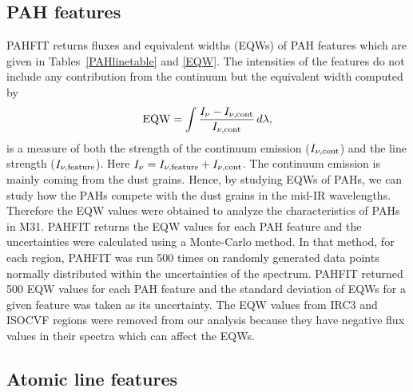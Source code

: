 \subsection{PAH features}
\label{sect:pah}
%
PAHFIT returns fluxes and equivalent widths (EQWs) of PAH features which are given in Tables~\ref{PAHlinetable} and \ref{EQW}. The intensities of the features do not include any contribution from the continuum but the equivalent width computed by
\begin{equation}
{\rm EQW}=\int \frac{I_{\nu} - I_{\nu, {\rm cont}}}{I_{\nu, {\rm cont}}} \,d\lambda,
\end{equation}
is a measure of both the strength of the continuum emission ($I_{\nu, {\rm cont}} $) and the line strength ($I_{\nu,{\rm feature}}$). 
Here $I_{\nu} =I_{\nu,{\rm feature}}+ I_{\nu, {\rm cont}} $. 
The continuum emission is mainly coming from the dust grains. Hence, by studying EQWs of PAHs, we can study how the PAHs compete with the dust grains in the mid-IR wavelengths. Therefore the EQW values were obtained to analyze the characteristics of PAHs in M31. PAHFIT returns the EQW values for each PAH feature and the uncertainties were calculated using a Monte-Carlo method. In that method, for each region, PAHFIT was run 500 times on randomly generated data points  normally distributed within the uncertainties of the spectrum. PAHFIT returned 500 EQW values for each PAH feature and the standard deviation of EQWs for a given feature was taken as its uncertainty. 
The EQW values from IRC3 and ISOCVF regions were removed from our analysis because they have negative flux values in their spectra which can affect the EQWs. 


\subsection{Atomic line features}
\label{sect:atomic}

